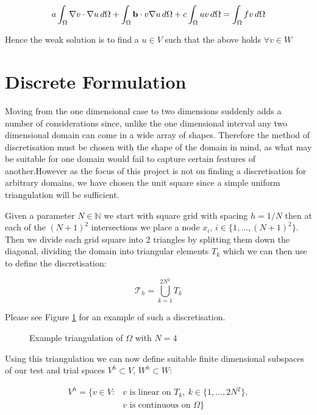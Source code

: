 \begin{equation}\label{eq:wk-twod-deterministic}
    a\int_{\Omega}\nabla{v}\cdot\nabla{u}\,d\Omega +
    \int_{\Omega}\mathbf{b}\cdot v\nabla{u}\,d\Omega + c\int_{\Omega}uv\,d\Omega =
    \int_{\Omega}fv\,d\Omega
\end{equation}

Hence the weak solution is to find a $u \in V$ such that the above holds
$\forall v \in W$

\section{Discrete Formulation}


Moving from the one dimensional case to two dimensions suddenly adds a number
of considerations since, unlike the one dimensional interval any two
dimensional domain can come in a wide array of shapes. Therefore the method of
discretisation must be chosen with the shape of the domain in mind, as what may
be suitable for one domain would fail to capture certain features of
another.However as the focus of this project is not on finding a discretisation
for arbitrary domains, we have chosen the unit square since a simple uniform
triangulation will be sufficient.

Given a parameter $N \in \mathbb{N}$ we start with square grid with spacing $h
= 1/N$ then at each of the $(N+1)^2$ intersections we place a node $x_i$, $i
\in \{1,\ldots,(N+1)^2\}$. Then we divide each grid square into 2 triangles by
splitting them down the diagonal, dividing the domain into triangular elements
$T_k$ which we can then use to define the discretisation:

\[
    \mathcal{T}_h = \bigcup_{k=1}^{2N^2} T_k
\]

Please see Figure \ref{fig:two-d-discretisation} for an example of such a
discretisation.

\begin{figure}
\centering

\caption{Example triangulation of $\Omega$ with $N = 4$}
\label{fig:two-d-discretisation}
\end{figure}

Using this triangulation we can now define suitable finite dimensional subspaces
of our test and trial spaces $V^h \subset V$, $W^h \subset W$:

\begin{align*}
    V^h = \{v \in V: &v \text{ is linear on } T_k,\ k \in \{1,\ldots,2N^2\}, \\
                     &v \text{ is continuous on } \Omega\}
\end{align*}

